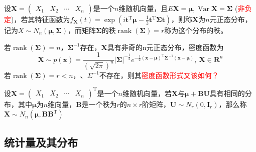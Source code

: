 \begin{definition}[$n$元正态分布]
    设$\boldsymbol{X} = \begin{pmatrix}
        X_1&X_2&\cdots&X_n
    \end{pmatrix}$是一个$n$维随机向量，且$E\boldsymbol{X} = \boldsymbol{\mu},\operatorname{Var}\boldsymbol{X} = \boldsymbol{\Sigma}$ (\textcolor{red}{非负定})，若其特征函数为$f_{\boldsymbol{X}}(t) = \exp(i\boldsymbol{t}^{\mathrm{T}}\boldsymbol{\mu}-\frac{1}{2}\boldsymbol{t}^{\mathrm{T}}\boldsymbol{\Sigma}\boldsymbol{t})$，则称$\boldsymbol{X}$为$n$元正态分布，记为$X\sim N_n(\boldsymbol{\mu},\boldsymbol{\Sigma})$，而矩阵$\boldsymbol{\Sigma}$的秩$\operatorname{rank}(\boldsymbol{\Sigma}) = r$称为这个分布的秩。
\end{definition}
\begin{note}
    若$\operatorname{rank}(\boldsymbol{\Sigma}) = n$，$\boldsymbol{\Sigma}^{-1}$存在，$\boldsymbol{X}$具有非奇的n元正态分布，密度函数为
    \[
        \boldsymbol{X}\sim p(\boldsymbol{x})=\dfrac{1}{(\sqrt{2\pi})^n}|\boldsymbol{\Sigma}|^{-\frac{1}{2}}e^{-\frac{1}{2}(\boldsymbol{x}-\boldsymbol{\mu})^{\mathrm{T}}\boldsymbol{\Sigma}^{-1}(\boldsymbol{x}-\boldsymbol{\mu})},\ \boldsymbol{X}\in\boldsymbol{R}^n
    \]
    若$\operatorname{rank}(\boldsymbol{\Sigma})=r<n$，$\boldsymbol、{\Sigma}^{-1}$不存在，则其\textcolor{red}{密度函数形式又该如何？}
\end{note}
\begin{definition}[多元正态分布]
    设$\boldsymbol{X} = \begin{pmatrix}
        X_1 & X_2 & \cdots & X_n
    \end{pmatrix}^{\mathrm{T}}$是一个$n$维随机向量，若$\boldsymbol{X}$与$\boldsymbol{\mu}+\boldsymbol{BU}$具有相同的分布，其中$\boldsymbol{\mu}$为$n$维向量，$\boldsymbol{B}$是一个秩为$r$的$n\times r$阶矩阵，$\boldsymbol{U}\sim N_{r}(0,\boldsymbol{I}_{r})$，那么称$\boldsymbol{X}\sim N_{n}(\boldsymbol{\mu}, \boldsymbol{BB}^{\mathrm{T}})$
\end{definition}
\subsection{统计量及其分布}

